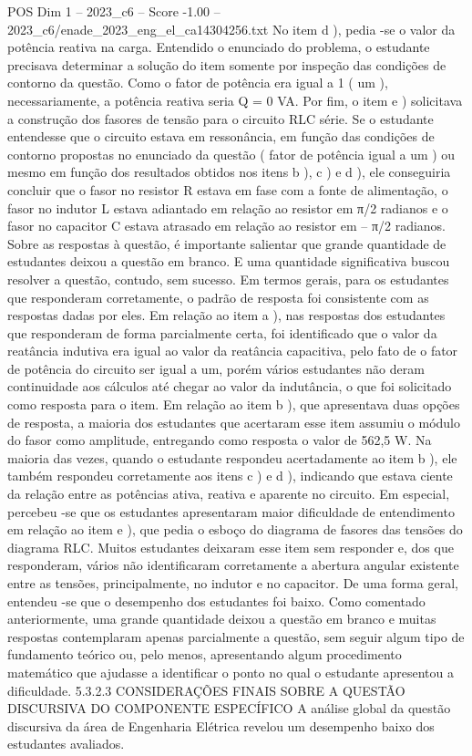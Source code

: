 \begin{textsample}{POS Dim 1 – 2023\_c6 – Score -1.00 – 2023\_c6/enade\_2023\_eng\_el\_ca14304256.txt}
No item d ), pedia -se o valor da potência reativa na carga.
Entendido o enunciado do problema, o estudante precisava determinar a solução do item somente por inspeção das condições de contorno da questão.
Como o fator de potência era igual a 1 ( um ), necessariamente, a potência reativa seria Q = 0 VA.
Por fim, o item e ) solicitava a construção dos fasores de tensão para o circuito RLC série.
Se o estudante entendesse que o circuito estava em ressonância, em função das condições de contorno propostas no enunciado da questão ( fator de potência igual a um ) ou mesmo em função dos resultados obtidos nos itens b ), c ) e d ), ele conseguiria concluir que o fasor no resistor R estava em fase com a fonte de alimentação, o fasor no indutor L estava adiantado em relação ao resistor em π/2 radianos e o fasor no capacitor C estava atrasado em relação ao resistor em – π/2 radianos.
Sobre as respostas à questão, é importante salientar que grande quantidade de estudantes deixou a questão em branco.
E uma quantidade significativa buscou resolver a questão, contudo, sem sucesso.
Em termos gerais, para os estudantes que responderam corretamente, o padrão de resposta foi consistente com as respostas dadas por eles.
Em relação ao item a ), nas respostas dos estudantes que responderam de forma parcialmente certa, foi identificado que o valor da reatância indutiva era igual ao valor da reatância capacitiva, pelo fato de o fator de potência do circuito ser igual a um, porém vários estudantes não deram continuidade aos cálculos até chegar ao valor da indutância, o que foi solicitado como resposta para o item.
Em relação ao item b ), que apresentava duas opções de resposta, a maioria dos estudantes que acertaram esse item assumiu o módulo do fasor como amplitude, entregando como resposta o valor de 562,5 W.
Na maioria das vezes, quando o estudante respondeu acertadamente ao item b ), ele também respondeu corretamente aos itens c ) e d ), indicando que estava ciente da relação entre as potências ativa, reativa e aparente no circuito.
Em especial, percebeu -se que os estudantes apresentaram maior dificuldade de entendimento em relação ao item e ), que pedia o esboço do diagrama de fasores das tensões do diagrama RLC.
Muitos estudantes deixaram esse item sem responder e, dos que responderam, vários não identificaram corretamente a abertura angular existente entre as tensões, principalmente, no indutor e no capacitor.
De uma forma geral, entendeu -se que o desempenho dos estudantes foi baixo.
Como comentado anteriormente, uma grande quantidade deixou a questão em branco e muitas respostas contemplaram apenas parcialmente a questão, sem seguir algum tipo de fundamento teórico ou, pelo menos, apresentando algum procedimento matemático que ajudasse a identificar o ponto no qual o estudante apresentou a dificuldade. 5.3.2.3 CONSIDERAÇÕES FINAIS SOBRE A QUESTÃO DISCURSIVA DO COMPONENTE ESPECÍFICO A análise global da questão discursiva da área de Engenharia Elétrica revelou um desempenho baixo dos estudantes avaliados.

\end{textsample}
